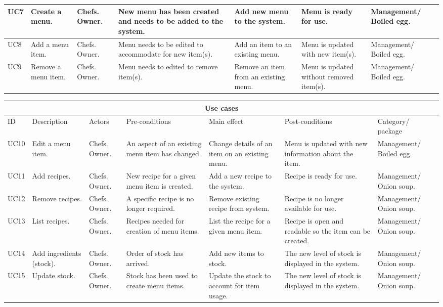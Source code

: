 \begin{table}[H]
\begin{tabularx}{\linewidth}{|X|X|X|X|X|X|X|}
\hline
UC7 & Create a menu. & Chefs. Owner. & New menu has been created and needs to be added to the system. & Add new menu to the system. & Menu is ready for use. & Management/ Boiled egg. \\
\hline
UC8 & Add a menu item. & Chefs. Owner. & Menu needs to be edited to accommodate for new item(s). & Add an item to an existing menu. & Menu is updated with new item(s). & Management/ Boiled egg. \\
\hline
UC9 & Remove a menu item. & Chefs. Owner. & Menu needs to edited to remove item(s). & Remove an item from an existing menu. & Menu is updated without removed item(s). & Management/ Boiled egg. \\
\hline
\end{tabularx}
\end{table}
\begin{tabularx}{\linewidth}{|X|X|X|X|X|X|X|}
\hline
\multicolumn{7}{c}{ Use cases } \\
\hline
ID & Description & Actors & Pre-conditions & Main effect & Post-conditions & Category/ package \\
\hline
UC10 & Edit a menu item. & Chefs. Owner. & An aspect of an existing menu item has changed. & Change details of an item on an existing menu. & Menu is updated with new information about the item. & Management/ Boiled egg. \\
\hline
UC11 & Add recipes. & Chefs. Owner. & New recipe for a given menu item is created. & Add a new recipe to the system. & Recipe is ready for use. & Management/ Onion soup. \\
\hline
UC12 & Remove recipes. & Chefs. Owner. & A specific recipe is no longer required. & Remove existing recipe from system. & Recipe is no longer available for use. & Management/ Onion soup. \\
\hline
UC13 & List recipes. & Chefs. Owner. & Recipes needed for creation of menu items. & List the recipe for a given menu item. & Recipe is open and readable so the item can be created. & Management/ Onion soup. \\
\hline
UC14 & Add ingredients (stock). & Chefs. Owner. & Order of stock has arrived. & Add new items to stock. & The new level of stock is displayed in the system. & Management/ Onion soup. \\
\hline
UC15 & Update stock. & Chefs. Owner. & Stock has been used to create menu items. & Update the stock to account for item usage. & The new level of stock is displayed in the system. & Management/ Onion soup. \\

\end{tabularx}
